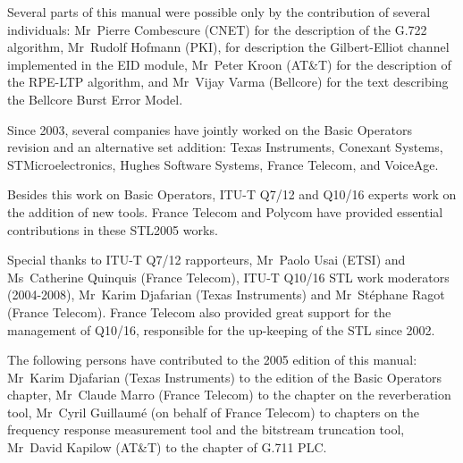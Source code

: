 Several parts of this manual were possible only by the contribution of several individuals: Mr~Pierre Combescure (CNET) for the description of the G.722 algorithm, Mr~Rudolf Hofmann (PKI), for description the Gilbert-Elliot channel implemented in the EID module, Mr~Peter Kroon (AT\&T) for the description of the RPE-LTP algorithm, and Mr~Vijay Varma (Bellcore) for the text describing the Bellcore Burst Error Model.

Since 2003, several companies have jointly worked on the Basic Operators revision and an alternative set addition: Texas Instruments, Conexant Systems, STMicroelectronics, Hughes Software Systems, France Telecom, and VoiceAge.

Besides this work on Basic Operators, ITU-T Q7/12 and Q10/16 experts work on the addition of new tools.
France Telecom and Polycom have provided essential contributions in these STL2005 works.

Special thanks to ITU-T Q7/12 rapporteurs, Mr~Paolo Usai (ETSI) and Ms~Catherine Quinquis (France Telecom), ITU-T Q10/16 STL work moderators (2004-2008), Mr~Karim Djafarian (Texas Instruments) and Mr~St\'{e}phane Ragot (France Telecom).
France Telecom also provided great support for the management of Q10/16, responsible for the up-keeping of the STL since 2002.

The following persons have contributed to the 2005 edition of this manual: Mr~Karim Djafarian (Texas Instruments) to the edition of the Basic Operators chapter, Mr~Claude Marro (France Telecom) to the chapter on the reverberation tool, Mr~Cyril Guillaum\'{e} (on behalf of France Telecom) to chapters on the frequency response measurement tool and the bitstream truncation tool, Mr~David Kapilow (AT\&T) to the chapter of G.711 PLC.


